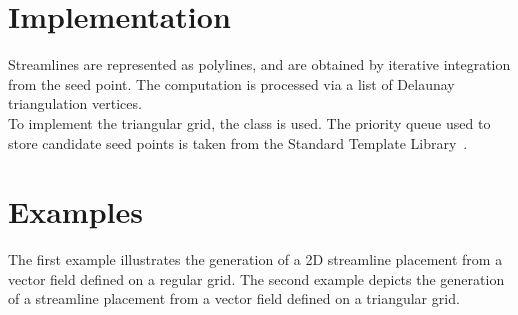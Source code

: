 \section{Implementation}
\label{Section_2D_Streamlines_Implementation}
Streamlines are represented as polylines, and are obtained by iterative
integration from the seed point. The computation is processed via a list of
Delaunay triangulation vertices.\\To implement the triangular grid, the \cgal
{} class is used. The priority queue used to store
candidate seed
points is taken from the Standard Template Library~\cite{cgal:sgcsi-stlpg-97}.

\section{Examples}
\label{Section_2D_Streamlines_Example}
The first example illustrates the generation of a 2D streamline placement from a 
vector field defined on a regular grid.
The second example depicts the generation of a streamline placement from a vector
field defined on a triangular grid.
